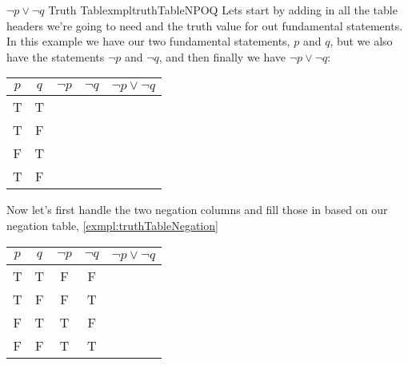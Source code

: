 \begin{exmpl}[label={exmpl:truthTableNPOQ}]{$\lnot p \lor \lnot q$ Truth Table}{xmpltruthTableNPOQ}
    Lets start by adding in all the table headers we're going to need and the truth value for out fundamental statements. In this example we have our two fundamental statements, $p$ and $q$, but we also have the statements $\lnot p$ and $\lnot q$, and then finally we have $\lnot p \lor \lnot q$:
    \begin{center}
        \begin{tabular}{|c|c|c|c|c|}
            \hline
            $p$ & $q$ & $\lnot p$ & $\lnot q$ & $\lnot p \lor \lnot q$ \\
            \hline
            T   & T   &           &           &                        \\
            \hline
            T   & F   &           &           &                        \\
            \hline
            F   & T   &           &           &                        \\
            \hline
            T   & F   &           &           &                        \\
            \hline
        \end{tabular}
    \end{center}
    \vspace{0.5cm}
    Now let's first handle the two negation columns and fill those in based on our negation table, \cref{exmpl:truthTableNegation}
    \begin{center}
        \begin{tabular}{|c|c|c|c|c|}
            \hline
            $p$ & $q$ & $\lnot p$ & $\lnot q$ & $\lnot p \lor \lnot q$ \\
            \hline
            T   & T   & F         & F         &                        \\
            \hline
            T   & F   & F         & T         &                        \\
            \hline
            F   & T   & T         & F         &                        \\
            \hline
            F   & F   & T         & T         &                        \\
            \hline
        \end{tabular}
    \end{center}
    \vspace{0.5cm}


\end{exmpl}
